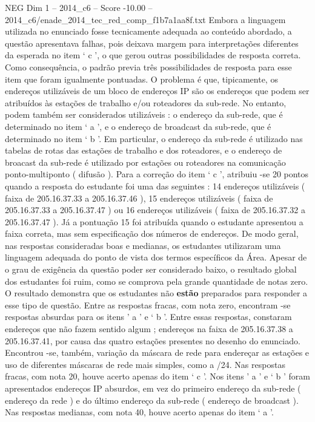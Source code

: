 \begin{textsample}{NEG Dim 1 – 2014\_c6 – Score -10.00 – 2014\_c6/enade\_2014\_tec\_red\_comp\_f1b7a1aa8f.txt}
Embora a linguagem utilizada no enunciado fosse tecnicamente adequada ao conteúdo abordado, a questão apresentava falhas, pois deixava margem para interpretações diferentes da esperada no item ‘ c ’, o que gerou outras possibilidades de resposta correta.
Como consequência, o padrão previa três possibilidades de resposta para esse item que foram igualmente pontuadas.
O problema é que, tipicamente, os endereços utilizáveis de um bloco de endereços IP são os endereços que podem ser atribuídos às estações de trabalho e/ou roteadores da sub-rede.
No entanto, podem também ser considerados utilizáveis : o endereço da sub-rede, que é determinado no item ‘ a ’, e o endereço de broadcast da sub-rede, que é determinado no item ‘ b ’.
Em particular, o endereço da sub-rede é utilizado nas tabelas de rotas das estações de trabalho e dos roteadores, e o endereço de broacast da sub-rede é utilizado por estações ou roteadores na comunicação ponto-multiponto ( difusão ).
Para a correção do item ‘ c ’, atribuiu -se 20 pontos quando a resposta do estudante foi uma das seguintes : 14 endereços utilizáveis ( faixa de 205.16.37.33 a 205.16.37.46 ), 15 endereços utilizáveis ( faixa de 205.16.37.33 a 205.16.37.47 ) ou 16 endereços utilizáveis ( faixa de 205.16.37.32 a 205.16.37.47 ).
Já a pontuação 15 foi atribuída quando o estudante apresentou a faixa correta, mas sem especificação dos números de endereços.
De modo geral, nas respostas consideradas boas e medianas, os estudantes utilizaram uma linguagem adequada do ponto de vista dos termos específicos da Área.
Apesar de o grau de exigência da questão poder ser considerado baixo, o resultado global dos estudantes foi ruim, como se comprova pela grande quantidade de notas zero.
O resultado demonstra que os estudantes não \textbf{estão} preparados para responder a esse tipo de questão.
Entre as respostas fracas, com nota zero, encontram -se respostas absurdas para os itens ’ a ’ e ‘ b ’.
Entre essas respostas, constaram endereços que não fazem sentido algum ; endereços na faixa de 205.16.37.38 a 205.16.37.41, por causa das quatro estações presentes no desenho do enunciado.
Encontrou -se, também, variação da máscara de rede para endereçar as estações e uso de diferentes máscaras de rede mais simples, como a /24.
Nas respostas fracas, com nota 20, houve acerto apenas do item ‘ c ’.
Nos itens ’ a ’ e ‘ b ’ foram apresentados endereços IP absurdos, em vez do primeiro endereço da sub-rede ( endereço da rede ) e do último endereço da sub-rede ( endereço de broadcast ).
Nas respostas medianas, com nota 40, houve acerto apenas do item ‘ a ’.

\end{textsample}
